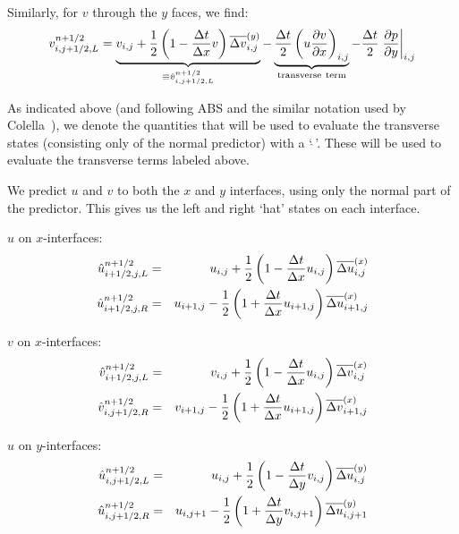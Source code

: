Similarly, for $v$ through the $y$ faces, we find:
\begin{equation}
v_{i,j+1/2,L}^{n+1/2} 
    = \underbrace{v_{i,j} + \frac{1}{2} \left ( 1 - \frac{\Delta t}{\Delta x} v \right ) \overline{\Delta v}^{(y)}_{i,j}}_{\equiv \hat{v}_{i,j+1/2,L}^{n+1/2}}
    - \underbrace{\frac{\Delta t}{2} \left ( u \frac{\partial v}{\partial x} \right )_{i,j}}_{\mathrm{transverse~term}}
    - \frac{\Delta t}{2} \left . \frac{\partial p}{\partial y} \right |_{i,j}
\label{eq:vMAC_l}
\end{equation} 

As indicated above (and following ABS and the similar notation used by
Colella~\cite{colella:1990}), we denote the quantities that will be used to evaluate
the transverse states (consisting only of the normal predictor) with a
`$\hat{~}$'.  These will be used to evaluate the transverse terms
labeled above.

We predict $u$ and $v$ to both the $x$ and $y$ interfaces, using only
the normal part of the predictor.  This gives us the left and right `hat'
states on each interface.

\noindent $u$ on $x$-interfaces:
\begin{eqnarray}
\hat{u}_{i+1/2,j,L}^{n+1/2} &=&
   u_{i,j} + \frac{1}{2} \left ( 1 - \frac{\Delta t}{\Delta x} u_{i,j} \right )
       \Dux_{i,j} \\ 
%
\hat{u}_{i+1/2,j,R}^{n+1/2} &=&
   u_{i+1,j} - \frac{1}{2} \left ( 1 + \frac{\Delta t}{\Delta x} u_{i+1,j} \right )
       \Dux_{i+1,j} 
\end{eqnarray}

\noindent $v$ on $x$-interfaces:
\begin{eqnarray}
\hat{v}_{i+1/2,j,L}^{n+1/2} &=&
   v_{i,j} + \frac{1}{2} \left ( 1 - \frac{\Delta t}{\Delta x} u_{i,j} \right )
       \Dvx_{i,j} \\ 
%
\hat{v}_{i,j+1/2,R}^{n+1/2} &=&
   v_{i+1,j} - \frac{1}{2} \left ( 1 + \frac{\Delta t}{\Delta x} u_{i+1,j} \right )
       \Dvx_{i+1,j} 
\end{eqnarray}

\noindent $u$ on $y$-interfaces:
\begin{eqnarray}
\hat{u}_{i,j+1/2,L}^{n+1/2} &=&
   u_{i,j} + \frac{1}{2} \left ( 1 - \frac{\Delta t}{\Delta y} v_{i,j} \right )
       \Duy_{i,j} \\ 
%
\hat{u}_{i,j+1/2,R}^{n+1/2} &=&
   u_{i,j+1} - \frac{1}{2} \left ( 1 + \frac{\Delta t}{\Delta y} v_{i,j+1} \right )
       \Duy_{i,j+1} 
\end{eqnarray}

